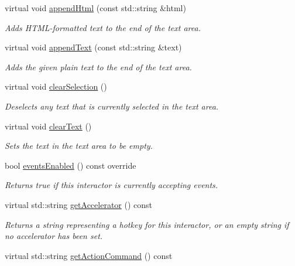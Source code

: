 \begin{DoxyCompactItemize}
virtual void \mbox{\hyperlink{classsgl_1_1GTextArea_aa3457253e58dbfbf65a8f5a28c65fb5f}{append\+Html}} (const std\+::string \&html)
\begin{DoxyCompactList}\small\item\em Adds H\+T\+M\+L-\/formatted text to the end of the text area. \end{DoxyCompactList}\item 
virtual void \mbox{\hyperlink{classsgl_1_1GTextArea_a6ba815b59563007b60dc2052d4703146}{append\+Text}} (const std\+::string \&text)
\begin{DoxyCompactList}\small\item\em Adds the given plain text to the end of the text area. \end{DoxyCompactList}\item 
virtual void \mbox{\hyperlink{classsgl_1_1GTextArea_abd07e172ccec6823a88289c21124a367}{clear\+Selection}} ()
\begin{DoxyCompactList}\small\item\em Deselects any text that is currently selected in the text area. \end{DoxyCompactList}\item 
virtual void \mbox{\hyperlink{classsgl_1_1GTextArea_a25f53c7d92eb2a5197cd4418c0165367}{clear\+Text}} ()
\begin{DoxyCompactList}\small\item\em Sets the text in the text area to be empty. \end{DoxyCompactList}\item 
bool \mbox{\hyperlink{classsgl_1_1GInteractor_a597a370b592e3737d38d9d2f4e2031ea}{events\+Enabled}} () const override
\begin{DoxyCompactList}\small\item\em Returns true if this interactor is currently accepting events. \end{DoxyCompactList}\item 
virtual std\+::string \mbox{\hyperlink{classsgl_1_1GInteractor_a69f8d23ed8f207fbecad99960776e942}{get\+Accelerator}} () const
\begin{DoxyCompactList}\small\item\em Returns a string representing a hotkey for this interactor, or an empty string if no accelerator has been set. \end{DoxyCompactList}\item 
virtual std\+::string \mbox{\hyperlink{classsgl_1_1GInteractor_a94eb4276000c4fdfb508ce9e6317a82a}{get\+Action\+Command}} () const

\end{DoxyCompactItemize}
